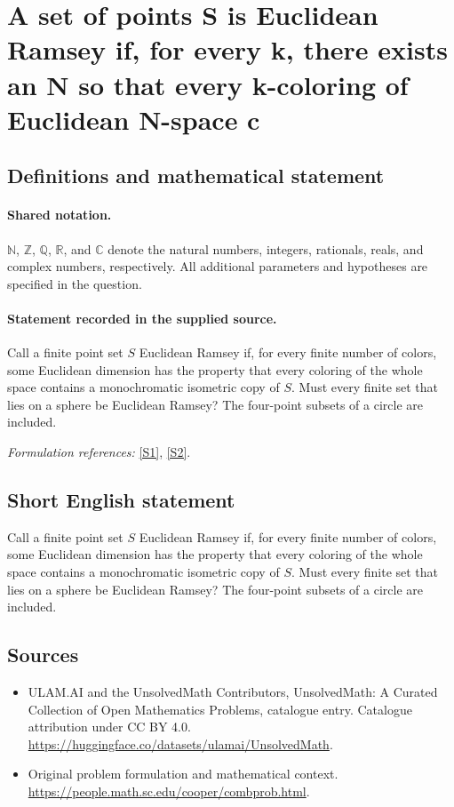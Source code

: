 \documentclass[11pt]{article}
\newcommand{\sref}[2]{\hyperlink{source:#1:#2}{[S#2]}}
\begin{document}
\section{A set of points S is Euclidean Ramsey if, for every k, there exists an N so that every k-coloring of Euclidean N-space c}\label{statement}

\subsection{Definitions and mathematical statement}

\paragraph{Shared notation.}$\mathbb N$, $\mathbb Z$, $\mathbb Q$, $\mathbb R$, and $\mathbb C$ denote the natural numbers, integers, rationals, reals, and complex numbers, respectively. All additional parameters and hypotheses are specified in the question.


\paragraph{Statement recorded in the supplied source.}
Call a finite point set $S$ Euclidean Ramsey if, for every finite number of colors, some Euclidean dimension has the property that every coloring of the whole space contains a monochromatic isometric copy of $S$. Must every finite set that lies on a sphere be Euclidean Ramsey? The four-point subsets of a circle are included.
\par\smallskip\textit{Formulation references:} \sref{statement}{1}, \sref{statement}{2}.
\subsection{Short English statement}
Call a finite point set $S$ Euclidean Ramsey if, for every finite number of colors, some Euclidean dimension has the property that every coloring of the whole space contains a monochromatic isometric copy of $S$. Must every finite set that lies on a sphere be Euclidean Ramsey? The four-point subsets of a circle are included.
\subsection{Sources}
\begin{itemize}
\item[\hypertarget{source:statement:1}{S1}] ULAM.AI and the UnsolvedMath Contributors, UnsolvedMath: A Curated Collection of Open Mathematics Problems, catalogue entry. Catalogue attribution under CC BY 4.0.
\url{https://huggingface.co/datasets/ulamai/UnsolvedMath}.
\item[\hypertarget{source:statement:2}{S2}] Original problem formulation and mathematical context.
\url{https://people.math.sc.edu/cooper/combprob.html}.
\end{itemize}
\label{end:statement}
\end{document}
